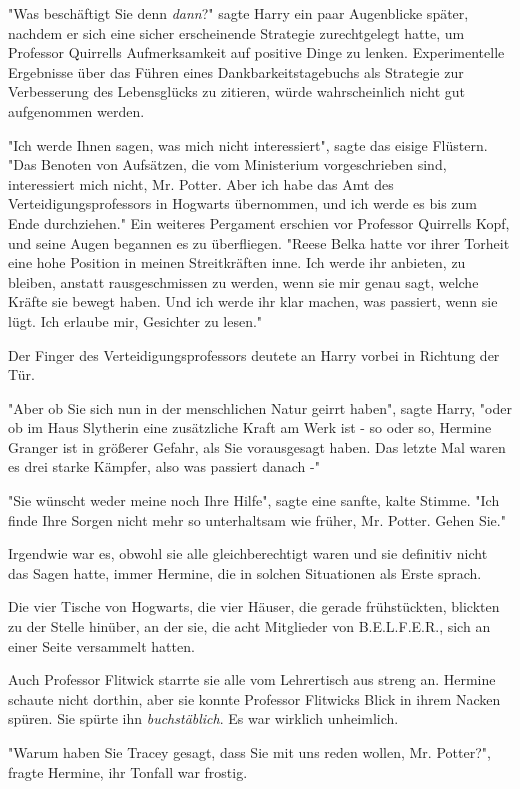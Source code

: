 {"Was beschäftigt Sie denn \emph{dann}?" sagte Harry ein paar Augenblicke später, nachdem er sich eine sicher erscheinende Strategie zurechtgelegt hatte, um Professor Quirrells Aufmerksamkeit auf positive Dinge zu lenken. Experimentelle Ergebnisse über das Führen eines Dankbarkeitstagebuchs als Strategie zur Verbesserung des Lebensglücks zu zitieren, würde wahrscheinlich nicht gut aufgenommen werden.

"Ich werde Ihnen sagen, was mich nicht interessiert", sagte das eisige Flüstern. "Das Benoten von Aufsätzen, die vom Ministerium vorgeschrieben sind, interessiert mich nicht, Mr. Potter. Aber ich habe das Amt des Verteidigungsprofessors in Hogwarts übernommen, und ich werde es bis zum Ende durchziehen." Ein weiteres Pergament erschien vor Professor Quirrells Kopf, und seine Augen begannen es zu überfliegen. "Reese Belka hatte vor ihrer Torheit eine hohe Position in meinen Streitkräften inne. Ich werde ihr anbieten, zu bleiben, anstatt rausgeschmissen zu werden, wenn sie mir genau sagt, welche Kräfte sie bewegt haben. Und ich werde ihr klar machen, was passiert, wenn sie lügt. Ich erlaube mir, Gesichter zu lesen."

Der Finger des Verteidigungsprofessors deutete an Harry vorbei in Richtung der Tür.

"Aber ob Sie sich nun in der menschlichen Natur geirrt haben", sagte Harry, "oder ob im Haus Slytherin eine zusätzliche Kraft am Werk ist - so oder so, Hermine Granger ist in größerer Gefahr, als Sie vorausgesagt haben. Das letzte Mal waren es drei starke Kämpfer, also was passiert danach -"

"Sie wünscht weder meine noch Ihre Hilfe", sagte eine sanfte, kalte Stimme. "Ich finde Ihre Sorgen nicht mehr so unterhaltsam wie früher, Mr. Potter. Gehen Sie."

Irgendwie war es, obwohl sie alle gleichberechtigt waren und sie definitiv nicht das Sagen hatte, immer Hermine, die in solchen Situationen als Erste sprach.

Die vier Tische von Hogwarts, die vier Häuser, die gerade frühstückten, blickten zu der Stelle hinüber, an der sie, die acht Mitglieder von B.E.L.F.E.R., sich an einer Seite versammelt hatten.

Auch Professor Flitwick starrte sie alle vom Lehrertisch aus streng an. Hermine schaute nicht dorthin, aber sie konnte Professor Flitwicks Blick in ihrem Nacken spüren. Sie spürte ihn \emph{buchstäblich}. Es war wirklich unheimlich.

"Warum haben Sie Tracey gesagt, dass Sie mit uns reden wollen, Mr. Potter?", fragte Hermine, ihr Tonfall war frostig.

}
